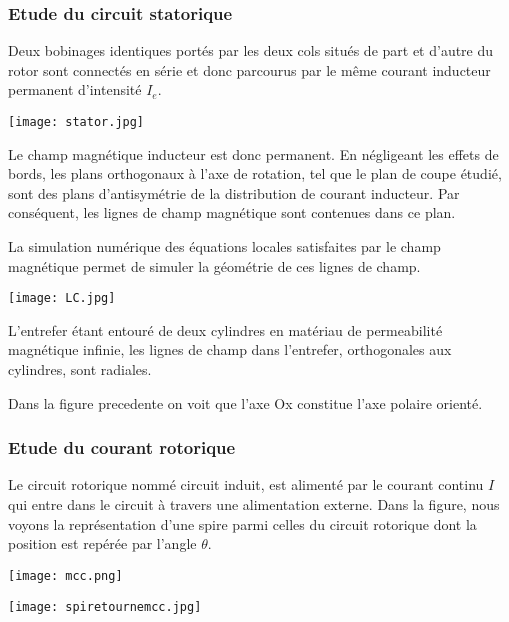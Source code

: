 \documentclass[12pt,prb,aps,epsf]{article}
\begin{document}
\subsubsection{Etude du circuit statorique}

Deux bobinages identiques portés par les deux cols situés de part et d'autre du rotor sont connectés en série et donc parcourus par le même courant inducteur permanent d'intensité $I_e$.\medskip

\begin{center}
    \texttt{[image: stator.jpg]}
\end{center}

Le champ magnétique inducteur est donc permanent. En négligeant les effets de bords, les plans orthogonaux à l'axe de rotation, tel que le plan de coupe étudié, sont des plans d'antisymétrie de la distribution de courant inducteur. Par conséquent, les lignes de champ magnétique sont contenues dans ce plan.\medskip

La simulation numérique des équations locales satisfaites par le champ magnétique permet de simuler la géométrie de ces lignes de champ.\medskip

\begin{center}
    \texttt{[image: LC.jpg]}
\end{center}

L'entrefer étant entouré de deux cylindres en matériau de permeabilité magnétique infinie, les lignes de champ dans l'entrefer, orthogonales aux cylindres, sont radiales.\medskip

Dans la figure precedente on voit que l'axe Ox constitue l'axe polaire orienté.

\subsubsection{Etude du courant rotorique}

Le circuit rotorique nommé circuit induit, est alimenté par le courant continu $I$ qui entre dans le circuit à travers une alimentation externe. Dans la figure, nous voyons la représentation d'une spire parmi celles du circuit rotorique dont la position est repérée par l'angle $\theta$. \medskip

\begin{center}
    \texttt{[image: mcc.png]}
\end{center}


\begin{center}
    \texttt{[image: spiretournemcc.jpg]}
\end{center}
\end{document}

